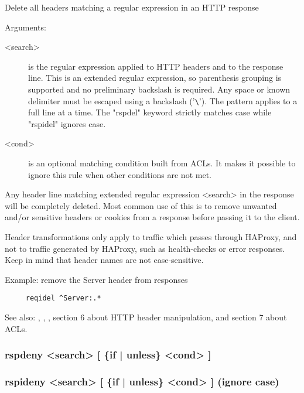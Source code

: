 
  Delete all headers matching a regular expression in an HTTP response


  Arguments:
  \begin{description}
  \item[<search>] is the regular expression applied to HTTP headers and to the
              response line. This is an extended regular expression, so
              parenthesis grouping is supported and no preliminary backslash
              is required. Any space or known delimiter must be escaped using
              a backslash ('\verb|\|'). The pattern applies to a full line at a time.
              The "rspdel" keyword strictly matches case while "rspidel"
              ignores case.

  \item[<cond>] is an optional matching condition built from ACLs. It makes it
              possible to ignore this rule when other conditions are not met.
  \end{description}

  Any header line matching extended regular expression <search> in the response
  will be completely deleted. Most common use of this is to remove unwanted
  and/or sensitive headers or cookies from a response before passing it to the
  client.

  Header transformations only apply to traffic which passes through HAProxy,
  and not to traffic generated by HAProxy, such as health-checks or error
  responses. Keep in mind that header names are not case-sensitive.

  Example: remove the Server header from responses
  \begin{verbatim}
     reqidel ^Server:.*
  \end{verbatim}

  See also: , , , section 6 about HTTP header
            manipulation, and section 7 about ACLs.

\subsubsection[rspdeny] {rspdeny <search> [ \{if | unless\} <cond> ]}
\subsubsection[rspideny] {rspideny <search> [ \{if | unless\} <cond> ] (ignore case)}

